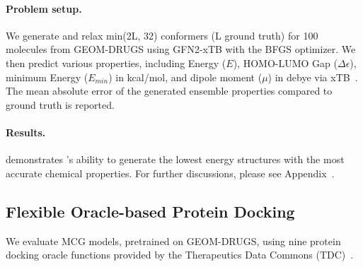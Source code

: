 \paragraph{Problem setup.} %
We generate and relax min(2L, 32) conformers (L ground truth) for 100 molecules from GEOM-DRUGS using GFN2-xTB with the BFGS optimizer. We then predict various properties, including Energy ($E$), HOMO-LUMO Gap ($\Delta \epsilon$), minimum Energy ($E_{min}$) in kcal/mol, and dipole moment ($\mu$) in debye via xTB~\citep{xtb}. The mean absolute error of the generated ensemble properties compared to ground truth is reported. 

\vspace{-2ex}
\paragraph{Results.} demonstrates \modelns's ability to generate the lowest energy structures with the most accurate chemical properties. For further discussions, please see Appendix~.


\vspace{-1ex}
\subsection{Flexible Oracle-based Protein Docking}
\label{sec:flex}
We evaluate MCG models, pretrained on GEOM-DRUGS, using nine protein docking oracle functions provided by the Therapeutics Data Commons (TDC)~\citep{tdc}.
\vspace{-1ex}

